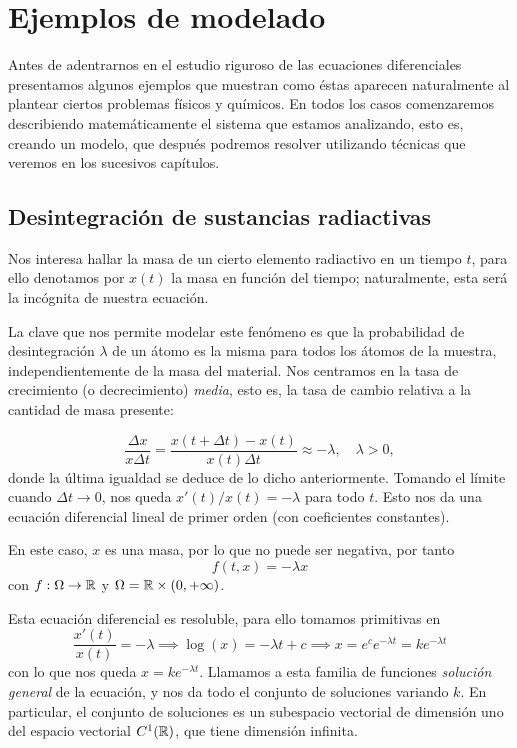 \documentclass[../ecuaciones_diferenciales.tex]{subfiles}
\begin{document}
\section{Ejemplos de modelado}

Antes de adentrarnos en el estudio riguroso de las ecuaciones diferenciales
presentamos algunos ejemplos que muestran como éstas aparecen naturalmente al
plantear ciertos problemas físicos y químicos. En todos los casos comenzaremos
describiendo matemáticamente el sistema que estamos analizando, esto es, creando
un modelo, que después podremos resolver utilizando técnicas que veremos en los
sucesivos capítulos.

\subsection{Desintegración de sustancias radiactivas}

Nos interesa hallar la masa de un cierto elemento radiactivo en un tiempo \(t\),
para ello denotamos por \(x(t)\) la masa en función del tiempo; naturalmente,
esta será la incógnita de nuestra ecuación.

La clave que nos permite modelar este fenómeno es que la probabilidad de
desintegración \(\lambda\) de un átomo es la misma para todos los átomos de la
muestra, independientemente de la masa del material. Nos centramos en la tasa de
crecimiento (o decrecimiento) \emph{media}, esto es, la tasa de cambio relativa
a la cantidad de masa presente:

\[\frac{\Delta x}{x \Delta t} = \frac{x(t + \Delta t) - x(t)}{x(t) \Delta t}
  \approx -\lambda, \quad \lambda > 0,\]
donde la última igualdad se deduce de lo dicho anteriormente.
Tomando el límite cuando \(\Delta t \to 0\), nos queda \(x'(t)/x(t) = -\lambda\)
para todo \(t\). Esto nos da una ecuación diferencial lineal de primer orden
(con coeficientes constantes).

En este caso, \(x\) es una masa, por lo que no puede ser negativa, por tanto
\[f(t, x) = -\lambda x\]
con \(f : \Omega \to \mathbb{R}\) y \(\Omega = \mathbb{R} \times (0, +\infty)\).

Esta ecuación diferencial es resoluble, para ello tomamos primitivas en
\[\frac{x'(t)}{x(t)} = -\lambda \implies \log(x) = -\lambda t + c
	\implies x = e^c e^{-\lambda t} = k e^{-\lambda t}\] con lo que nos queda
\(x = k e^{-\lambda t}\). Llamamos a esta familia de funciones \emph{solución general}
de la ecuación, y nos da todo el conjunto de soluciones variando \(k\). En
particular, el conjunto de soluciones es un subespacio vectorial de dimensión
uno del espacio vectorial \(C^1(\mathbb{R})\), que tiene dimensión infinita.
\end{document}

